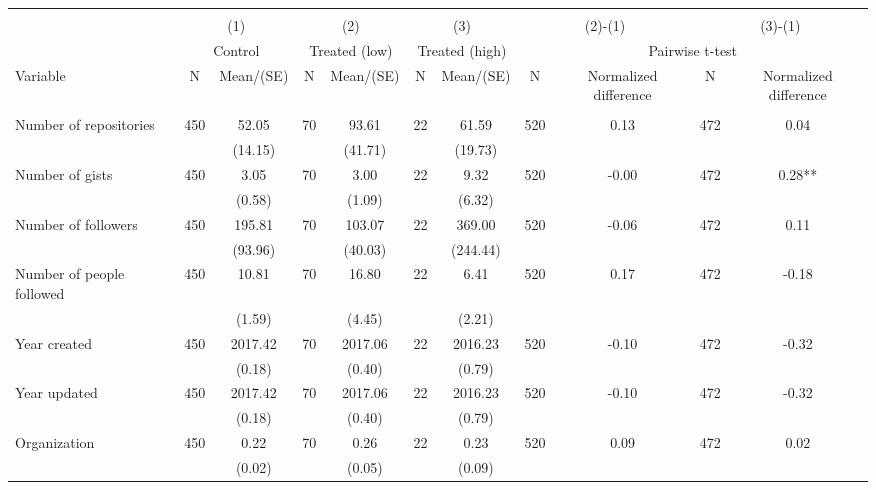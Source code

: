 \begin{tabular}{@{\extracolsep{5pt}}lcccccccccc}
\\[-1.8ex]\hline \hline \\[-1.8ex]
 & \multicolumn{2}{c}{(1)}  & \multicolumn{2}{c}{(2)}  & \multicolumn{2}{c}{(3)}  & \multicolumn{2}{c}{(2)-(1)} & \multicolumn{2}{c}{(3)-(1)} \\
 & \multicolumn{2}{c}{Control}  & \multicolumn{2}{c}{Treated (low)}  & \multicolumn{2}{c}{Treated (high)}  & \multicolumn{4}{c}{Pairwise t-test}  \\
Variable & N & Mean/(SE) & N & Mean/(SE) & N & Mean/(SE) & N & Normalized difference & N & Normalized difference \\ \hline \\[-1.8ex] 
Number of repositories   & 450    & 52.05    & 70    & 93.61    & 22    & 61.59    & 520    & 0.13    & 472    & 0.04   \\
 &   & (14.15)  &   & (41.71)  &   & (19.73)  &   &  &   &  \\ [1ex]
Number of gists   & 450    & 3.05    & 70    & 3.00    & 22    & 9.32    & 520    & -0.00    & 472    & 0.28**   \\
 &   & (0.58)  &   & (1.09)  &   & (6.32)  &   &  &   &  \\ [1ex]
Number of followers   & 450    & 195.81    & 70    & 103.07    & 22    & 369.00    & 520    & -0.06    & 472    & 0.11   \\
 &   & (93.96)  &   & (40.03)  &   & (244.44)  &   &  &   &  \\ [1ex]
Number of people followed   & 450    & 10.81    & 70    & 16.80    & 22    & 6.41    & 520    & 0.17    & 472    & -0.18   \\
 &   & (1.59)  &   & (4.45)  &   & (2.21)  &   &  &   &  \\ [1ex]
Year created   & 450    & 2017.42    & 70    & 2017.06    & 22    & 2016.23    & 520    & -0.10    & 472    & -0.32   \\
 &   & (0.18)  &   & (0.40)  &   & (0.79)  &   &  &   &  \\ [1ex]
Year updated   & 450    & 2017.42    & 70    & 2017.06    & 22    & 2016.23    & 520    & -0.10    & 472    & -0.32   \\
 &   & (0.18)  &   & (0.40)  &   & (0.79)  &   &  &   &  \\ [1ex]
Organization   & 450    & 0.22    & 70    & 0.26    & 22    & 0.23    & 520    & 0.09    & 472    & 0.02   \\
 &   & (0.02)  &   & (0.05)  &   & (0.09)  &   &  &   &  \\ [1ex]

\end{tabular}
